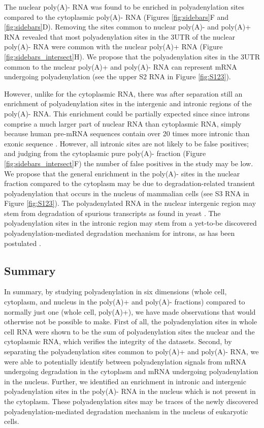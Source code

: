 The nuclear poly(A)- RNA was found to be enriched in polyadenylation sites
compared to the cytoplasmic poly(A)- RNA (Figures \ref{fig:sidebars}F and
\ref{fig:sidebars}D). Removing the sites common to nuclear poly(A)- and
poly(A)+ RNA revealed that most polyadenylation sites in the 3\ppp UTR of the
nuclear poly(A)- RNA were common with the nuclear poly(A)+ RNA (Figure
\ref{fig:sidebars_intersect}H). We propose that the polyadenylation sites in
the 3\ppp UTR common to the nuclear poly(A)+ and poly(A)- RNA can represent
mRNA undergoing polyadenylation (see the upper S2 RNA in Figure
\ref{fig:S123}).

However, unlike for the cytoplasmic RNA, there was after separation still an
enrichment of polyadenylation sites in the intergenic and intronic regions of
the poly(A)- RNA. This enrichment could be partially expected since since
introns comprise a much larger part of nuclear RNA than cytoplasmic RNA, simply
because human pre-mRNA sequences contain over 20 times more intronic than
exonic sequence \cite{venter_sequence_2001}. However, all intronic sites are
not likely to be false positives; and judging from the cytoplasmic pure
poly(A)- fraction (Figure \ref{fig:sidebars_intersect}F) the number of false
positives in the study may be low. We propose that the general enrichment in
the poly(A)- sites in the nuclear fraction compared to the cytoplasm may be due
to degradation-related transient polyadenylation that occurs in the nucleus of
mammalian cells \cite{lemay_nuclear_2010} (see S3 RNA in Figure \ref{fig:S123}).
The polyadenylated RNA in the nuclear intergenic region may stem from
degradation of spurious transcripts as found in yeast
\cite{wyers_cryptic_2005}. The polyadenylation sites in the intronic region may
stem from a yet-to-be discovered polyadenylation-mediated degradation mechanism
for introns, as has been postulated \cite{schmidt_polyadenylation_2010}.

\subsection{Summary}
In summary, by studying polyadenylation in six dimensions (whole cell,
cytoplasm, and nucleus in the poly(A)+ and poly(A)- fractions) compared to
normally just one (whole cell, poly(A)+), we have made observations that would
otherwise not be possible to make. First of all, the polyadenylation sites in
whole cell RNA were shown to be the sum of polyadenylation sites the nuclear
and the cytoplasmic RNA, which verifies the integrity of the datasets. Second,
by separating the polyadenylation sites common to poly(A)+ and poly(A)- RNA, we
were able to potentially identify between polyadenylation signals from mRNA
undergoing degradation in the cytoplasm and mRNA undergoing polyadenylation in
the nucleus. Further, we identified an enrichment in intronic and intergenic
polyadenylation sites in the poly(A)- RNA in the nucleus which is not present
in the cytoplasm. These polyadenylation sites may be traces of the newly
discovered polyadenylation-mediated degradation mechanism in the nucleus of
eukaryotic cells.  

